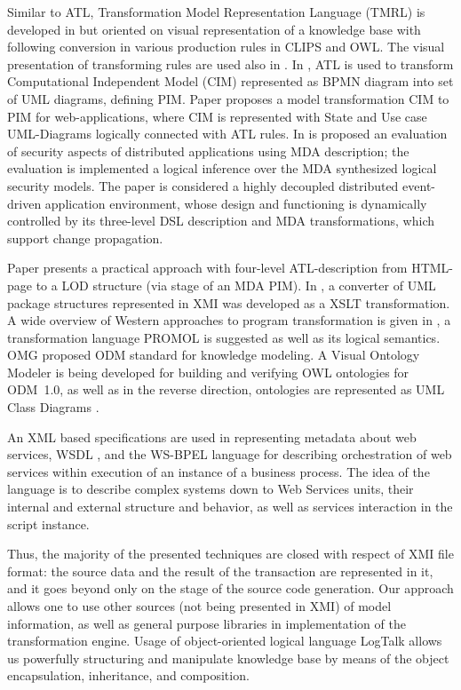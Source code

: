 \documentclass[conference]{IEEEtran}
\begin{document}
Similar to ATL, Transformation Model Representation Language (TMRL) is developed in \cite{nikita} but oriented on visual representation of a knowledge base with following conversion in various production rules in CLIPS and OWL.  The visual presentation of transforming rules are used also in \cite{GT}.  In \cite{azis}, ATL is used to transform Computational Independent Model (CIM) represented as BPMN diagram into set of UML diagrams, defining PIM. Paper \cite{Rhazali} proposes a model transformation CIM to PIM for web-applications, where CIM is represented with State and Use case UML-Diagrams logically connected with ATL rules.  In \cite{Hamid} is proposed an evaluation of security aspects of distributed applications using MDA description; the evaluation is implemented a logical inference over the MDA synthesized logical security models. The paper \cite{Zdun} is considered a highly decoupled distributed event-driven application environment, whose design and functioning is dynamically controlled by its three-level DSL description and MDA transformations, which support change propagation.

Paper \cite{Malki} presents a practical approach with four-level ATL-description from HTML-page to a LOD structure (via stage of an MDA PIM). In \cite{uml2owl}, a converter of UML package structures represented in XMI was developed as a XSLT transformation. A wide overview of Western approaches to program transformation is given in \cite{Dama,Dama2}, a transformation language PROMOL is suggested as well as its logical semantics. OMG proposed ODM standard \cite{odmprof} for knowledge modeling.  A Visual Ontology Modeler \cite{odnext} is being developed for building and verifying OWL ontologies for ODM~1.0, as well as in the reverse direction, ontologies are represented as UML Class Diagrams \cite{odmvis}.

An XML based specifications are used in representing metadata about web services, WSDL \cite{wsdl}, and the WS-BPEL language \cite{wsbpel} for describing orchestration of web services within execution of an instance of a business process.  The idea of the language is to describe complex systems down to Web Services units, their internal and external structure and behavior, as well as services interaction in the script instance.

Thus, the majority of the presented techniques are closed with respect of XMI file format: the source data and the result of the transaction are represented in it, and it goes beyond only on the stage of the source code generation.  Our approach allows one to use other sources (not being presented in XMI) of model information, as well as general purpose libraries in implementation of the transformation engine.  Usage of object-oriented logical language LogTalk allows us powerfully structuring and manipulate knowledge base by means of the object encapsulation, inheritance, and composition.
\end{document}
